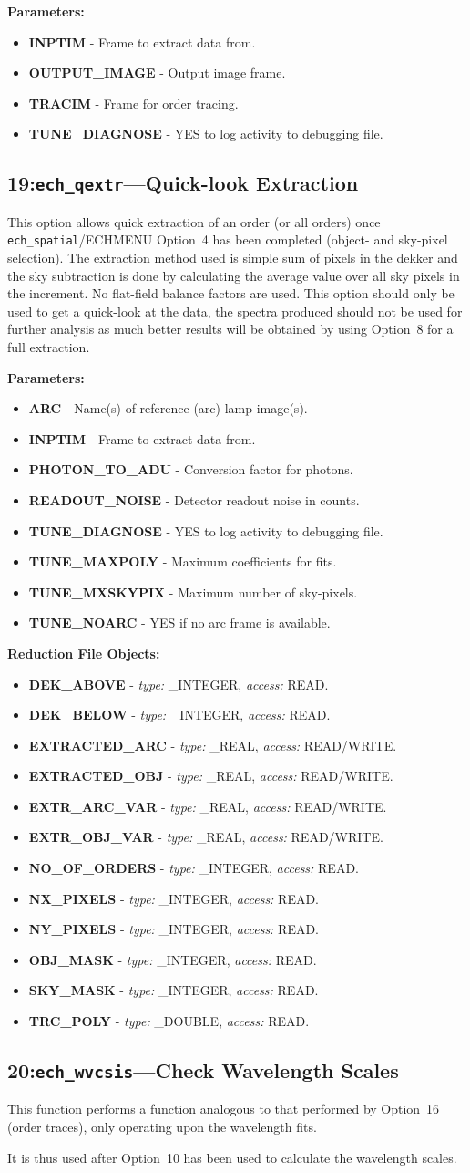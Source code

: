 \documentclass[11pt,twoside]{article}
\makeatletter
\newcommand{\stardocinitials}  {SUN}
\newcommand{\stardocnumber}    {152.4}
\newcommand{\stardocname}{\stardocinitials /\stardocnumber}
\newcommand{\htmlref}[2]{#1}
\newcommand{\xlabel}[1]{}
\newcommand{\myindex}[1]{\index{#1}}
\renewcommand{\myindex}[1]{}
\newcommand{\cmdname}{\begingroup \catcode`\_=12 \realcmdname}
\newcommand{\realcmdname}[1]{\endgroup\texttt{#1}}
\newlength{\sstbannerlength}
\newlength{\sstcaptionlength}
\newcommand{\echtask}[4]{
   \goodbreak
   \rule{\textwidth}{0.5mm}
   \vspace{-7ex}
   \newline
   \settowidth{\sstbannerlength}{{\Large {\bf #3}}}
   \setlength{\sstcaptionlength}{\textwidth}
   \addtolength{\sstbannerlength}{0.5em}
   \addtolength{\sstcaptionlength}{-2.0\sstbannerlength}
   \addtolength{\sstcaptionlength}{-5.0pt}
   \parbox[t]{\sstbannerlength}{\flushleft{\Large {\bf #3}}}
   \parbox[t]{\sstcaptionlength}{\center{\Large #4}}
   \parbox[t]{\sstbannerlength}{\flushright{\Large {\bf #3}}}
   \label{#1}\label{#2}
   \markboth{#3}{\stardocname}
   \uppercase{\myindex{#2@\protect\cmdname{#2}}}
}
\renewcommand{\echtask}[4]
{
  \subsection{\xlabel{#1}\xlabel{#2}\label{#1}\label{#2}#3---#4}
  \markboth{#3}{\stardocname}
}
\newcommand{\echpars}[1]{
{\bf Parameters:\vspace*{6pt}\\}
    #1
}
\renewcommand{\echpars}[1]{
{\bf Parameters:}
\begin{itemize}
#1
\end{itemize}
}
\newcommand{\epar}[3]
{
    \hspace*{5mm}\makebox[50mm][l]{\bf #1} #2 (p~\pageref{par_#3}.)\\
}
\renewcommand{\epar}[3]
{\item \htmlref{{\bf #1}}{par_#3} - #2}
\newcommand{\lepar}[3]
{
    \hspace*{5mm}\makebox[50mm][l]{\bf #1} #2 (p~\pageref{par_#3}.)
}
\renewcommand{\lepar}[3]
{\item \htmlref{{\bf #1}}{par_#3} - #2}
\newcommand{\echredobj}[1]{
{\bf Reduction File Objects:\vspace*{6pt}\\}
      \hspace*{5mm}\makebox[50mm][l]{Object}\makebox[25mm][l]{Type}{Access}\\
      #1
}
\renewcommand{\echredobj}[1]{
{\bf Reduction File Objects:}
\begin{itemize}
#1
\end{itemize}
}
\newcommand{\eobj}[3]
{
    \hspace*{5mm}\makebox[50mm][l]{\bf #1}\makebox[25mm][l]{\tt #2}{\tt #3}\\
}
\renewcommand{\eobj}[3]
{\item {\bf #1} - {\it type:} #2, {\it access:} #3.}
\newcommand{\leobj}[3]
{
    \hspace*{5mm}\makebox[50mm][l]{\bf #1}\makebox[25mm][l]{\tt #2}{\tt #3}
}
\renewcommand{\leobj}[3]
{\item {\bf #1} - {\it type:} #2, {\it access:} #3.}
\makeatother
\begin{document}
\echpars{
\epar{INPTIM}{Frame to extract data from.}{INPTIM}
\epar{OUTPUT\_IMAGE}{Output image frame.}{OUTPUT_IMAGE}
\epar{TRACIM}{Frame for order tracing.}{TRACIM}
\lepar{TUNE\_DIAGNOSE}{YES to log activity to debugging file.}{TUNE_DIAGNOSE}
}

\echtask{option19}{ech_qextr}{19:{\tt ech\_qextr}}{Quick-look Extraction}
\myindex{Quick-look extraction}
\myindex{Extraction!quick-look}

This option allows quick extraction of an order (or all orders) once
\htmlref{{\tt ech\_spatial}/ECHMENU Option~4}{ech_spatial}
has been completed (object- and sky-pixel selection). The
extraction method used is simple sum of pixels in the dekker and the sky
subtraction is done by calculating the average value over all sky pixels in
the increment. No flat-field balance factors are used. This option should
only be used to get a quick-look at the data, the spectra produced should
not be used for further analysis as much better results will be obtained by
using Option~8 for a full extraction.

\echpars{
\epar{ARC}{Name(s) of reference (arc) lamp image(s).}{ARC}
\epar{INPTIM}{Frame to extract data from.}{INPTIM}
\epar{PHOTON\_TO\_ADU}{Conversion factor for photons.}{PHOTON_TO_ADU}
\epar{READOUT\_NOISE}{Detector readout noise in counts.}{READOUT_NOISE}
\epar{TUNE\_DIAGNOSE}{YES to log activity to debugging file.}{TUNE_DIAGNOSE}
\epar{TUNE\_MAXPOLY}{Maximum coefficients for fits.}{TUNE_MAXPOLY}
\epar{TUNE\_MXSKYPIX}{Maximum number of sky-pixels.}{TUNE_MXSKYPIX}
\lepar{TUNE\_NOARC}{YES if no arc frame is available.}{TUNE_NOARC}
}


\echredobj{
\eobj{DEK\_ABOVE}{\_INTEGER}{READ}
\eobj{DEK\_BELOW}{\_INTEGER}{READ}
\eobj{EXTRACTED\_ARC}{\_REAL}{READ/WRITE}
\eobj{EXTRACTED\_OBJ}{\_REAL}{READ/WRITE}
\eobj{EXTR\_ARC\_VAR}{\_REAL}{READ/WRITE}
\eobj{EXTR\_OBJ\_VAR}{\_REAL}{READ/WRITE}
\eobj{NO\_OF\_ORDERS}{\_INTEGER}{READ}
\eobj{NX\_PIXELS}{\_INTEGER}{READ}
\eobj{NY\_PIXELS}{\_INTEGER}{READ}
\eobj{OBJ\_MASK}{\_INTEGER}{READ}
\eobj{SKY\_MASK}{\_INTEGER}{READ}
\leobj{TRC\_POLY}{\_DOUBLE}{READ}
}


\echtask{option20}{ech_wvcsis}{20:{\tt ech\_wvcsis}}{Check Wavelength Scales}
\myindex{Wavelength scales!consistency check}

This function performs a function analogous to that performed by
\htmlref{Option~16}{ech_trcsis}
(order traces), only operating upon the wavelength fits.

It is thus used after \htmlref{Option~10}{ech_idwave} has been used
to calculate the wavelength scales.
\end{document}
